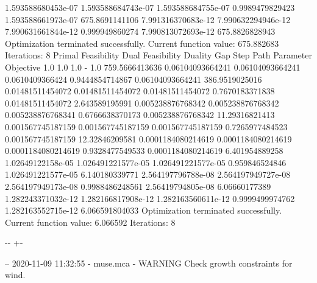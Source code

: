 \documentclass[letterpaper,10pt,english]{sphinxmanual}
\newlength\nbsphinxcodecellspacing
\begin{document}
{\begin{sphinxVerbatim}[commandchars=\\\{\}]
1.593588680453e-07  1.593588684743e-07  1.593588684755e-07  0.9989479829423  1.593588661973e-07  675.8691141106
7.991316370683e-12  7.990632294946e-12  7.990631661844e-12  0.999949860274   7.990813072693e-12  675.8826828943
Optimization terminated successfully.
         Current function value: 675.882683
         Iterations: 8
Primal Feasibility  Dual Feasibility    Duality Gap         Step             Path Parameter      Objective
1.0                 1.0                 1.0                 -                1.0                 759.5666413636
0.06104093664241    0.06104093664241    0.0610409366424     0.9444854714867  0.06104093664241    386.9519025016
0.01481511454072    0.01481511454072    0.01481511454072    0.7670183371838  0.01481511454072    2.643589195991
0.005238876768342   0.005238876768342   0.005238876768341   0.6766638370173  0.005238876768342   11.29316821413
0.001567745187159   0.001567745187159   0.001567745187159   0.7265977484523  0.001567745187159   12.32846209581
0.0001184080214619  0.0001184080214619  0.0001184080214619  0.9328477549533  0.0001184080214619  6.401954889258
1.02649122158e-05   1.026491221577e-05  1.026491221577e-05  0.959846524846   1.026491221577e-05  6.140180339771
2.564197796788e-08  2.564197949727e-08  2.564197949173e-08  0.9988486248561  2.56419794805e-08   6.06660177389
1.282243371032e-12  1.282166817908e-12  1.282163560611e-12  0.9999499974762  1.282163552715e-12  6.066591804033
Optimization terminated successfully.
         Current function value: 6.066592
         Iterations: 8
\end{sphinxVerbatim}
}

{

\kern-\sphinxverbatimsmallskipamount\kern-\baselineskip
\kern+\FrameHeightAdjust\kern-\fboxrule
\vspace{\nbsphinxcodecellspacing}

\begin{sphinxVerbatim}[commandchars=\\\{\}]
-- 2020-11-09 11:32:55 - muse.mca - WARNING
Check growth constraints for wind.

\end{sphinxVerbatim}
}
\end{document}
